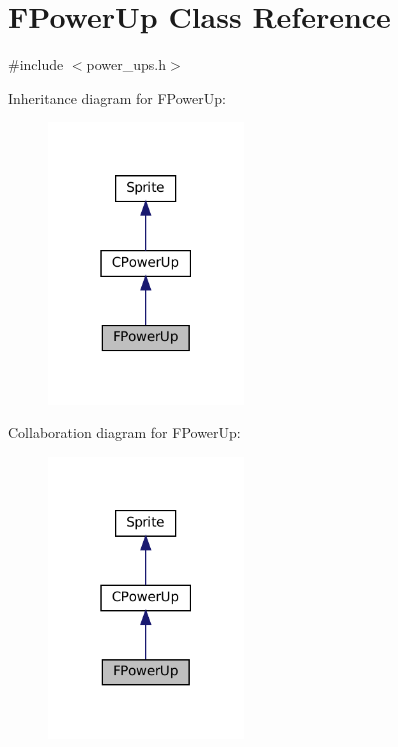 \hypertarget{classFPowerUp}{}\section{F\+Power\+Up Class Reference}
\label{classFPowerUp}


{\ttfamily \#include $<$power\+\_\+ups.\+h$>$}



Inheritance diagram for F\+Power\+Up\+:\nopagebreak
\begin{figure}[H]
\begin{center}
\leavevmode
\includegraphics[width=147pt]{classFPowerUp__inherit__graph}
\end{center}
\end{figure}


Collaboration diagram for F\+Power\+Up\+:\nopagebreak
\begin{figure}[H]
\begin{center}
\leavevmode
\includegraphics[width=147pt]{classFPowerUp__coll__graph}
\end{center}
\end{figure}
